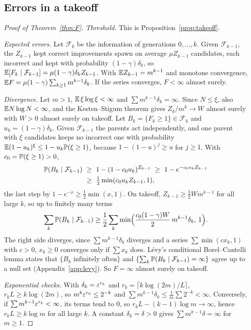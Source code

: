 \subsection{Errors in a takeoff}

\begin{proof}[Proof of Theorem~\ref{thm:F}]
\emph{Threshold.} This is Proposition~\ref{prop:takeoff}.

\emph{Expected errors.} Let $\mathcal F_{k}$ be the information of generations $0,\dots,k$. Given $\mathcal F_{k-1}$, the $Z_{k-1}$ kept correct improvements spawn on average $\mu Z_{k-1}$ candidates, each incorrect and kept with probability $(1-\gamma)\delta_{k}$, so $\mathbb{E}[F_{k}\mid\mathcal F_{k-1}]=\mu(1-\gamma)\delta_{k}Z_{k-1}$. With $\mathbb{E} Z_{k-1}=m^{k-1}$ and monotone convergence, $\mathbb{E} F=\mu(1-\gamma)\sum_{k\ge1}m^{k-1}\delta_{k}$. If the series converges, $F<\infty$ almost surely.

\emph{Divergence.} Let $m>1$, $\mathbb{E}\,\xi\log\xi<\infty$ and $\sum m^{k-1}\delta_{k}=\infty$. Since $N\le\xi$, also $\mathbb{E} N\log N<\infty$, and the Kesten--Stigum theorem \cite{KS66,AN72} gives $Z_{k}/m^{k}\to W$ almost surely with $W>0$ almost surely on takeoff. Let $B_{k}=\{F_{k}\ge1\}\in\mathcal F_{k}$ and $u_{k}=(1-\gamma)\delta_{k}$. Given $\mathcal F_{k-1}$ the parents act independently, and one parent with $\xi$ candidates keeps no incorrect one with probability $\mathbb{E}(1-u_{k})^{\xi}\le1-u_{k}\mathbb{P}(\xi\ge1)$, because $1-(1-u)^{j}\ge u$ for $j\ge1$. With $c_{0}=\mathbb{P}(\xi\ge1)>0$,
\[
\begin{aligned}
\PR(B_{k}\mid\mathcal F_{k-1})&\ \ge\ 1-(1-c_{0}u_{k})^{Z_{k-1}}\ \ge\ 1-e^{-c_{0}u_{k}Z_{k-1}}\\
&\ \ge\ \tfrac12\min(c_{0}u_{k}Z_{k-1},1),
\end{aligned}
\]
the last step by $1-e^{-x}\ge\frac12\min(x,1)$. On takeoff, $Z_{k-1}\ge\frac12Wm^{k-1}$ for all large $k$, so up to finitely many terms
\[
\sum_{k}\mathbb{P}(B_{k}\mid\mathcal F_{k-1})\ge\frac12\sum_{k}\min\Bigl(\frac{c_{0}(1-\gamma)W}{2}\,m^{k-1}\delta_{k},\,1\Bigr).
\]
 The right side diverges, since $\sum m^{k-1}\delta_{k}$ diverges and a series $\sum\min(cx_{k},1)$ with $c>0$, $x_{k}\ge0$ converges only if $\sum x_{k}$ does. L\'evy's conditional Borel--Cantelli lemma \cite{Dur19} states that $\{B_{k}\text{ infinitely often}\}$ and $\{\sum_{k}\mathbb{P}(B_{k}\mid\mathcal F_{k-1})=\infty\}$ agree up to a null set (Appendix~\ref{app:levy}). So $F=\infty$ almost surely on takeoff.

\emph{Exponential checks.} With $\delta_{k}=\varepsilon^{r_{k}}$ and $r_{k}=\lceil k\log(2m)/L\rceil$, $r_{k}L\ge k\log(2m)$, so $m^{k}\varepsilon^{r_{k}}\le2^{-k}$ and $\sum m^{k-1}\delta_{k}\le\frac1m\sum2^{-k}<\infty$. Conversely, if $\sum m^{k-1}\varepsilon^{r_{k}}<\infty$, its terms tend to $0$, so $r_{k}L-(k-1)\log m\to\infty$, hence $r_{k}L\ge k\log m$ for all large $k$. A constant $\delta_{k}=\delta>0$ gives $\sum m^{k-1}\delta=\infty$ for $m\ge1$.
\end{proof}

